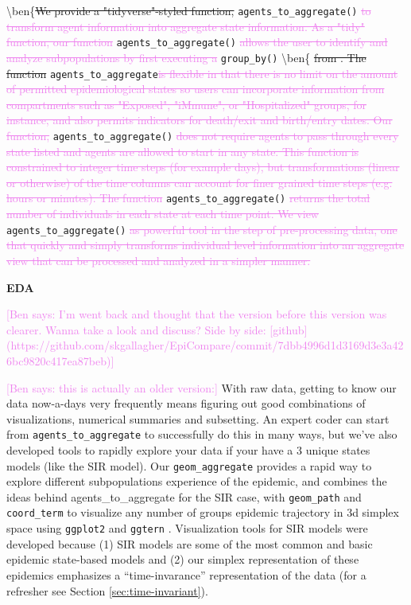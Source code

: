 \documentclass[
  shortnames]{jss}
\begin{document}
\textbackslash ben\{\sout{We provide a "tidyverse"-styled function, }\texttt{agents\_to\_aggregate()}\textcolor{violet}{\sout{ to transform agent information into aggregate state information.  As a "tidy" function, our function }}\texttt{agents\_to\_aggregate()}
\textcolor{violet}{\sout{allows the user to identify and analyze subpopulations by first executing a }}\texttt{group\_by()}
\textbackslash ben\{\sout{{ from . The function }}\texttt{agents\_to\_aggregate}\textcolor{violet}{\sout{is flexible in that there is no limit on the amount of permitted epidemiological states so users can incorporate information from compartments such as "Exposed", "iMmune", or "Hospitalized" groups, for instance, and also permits indicators for death/exit and birth/entry dates. Our function,}}
\texttt{agents\_to\_aggregate()}\textcolor{violet}{\sout{ does not require agents to pass through every state listed and agents are allowed to start in any state. This function is constrained to integer time steps (for example days), but transformations (linear or otherwise) of the time columns can account for finer grained time steps (e.g. hours or minutes). The function }}\texttt{agents\_to\_aggregate()}\textcolor{violet}{\sout{ returns the total number of individuals in each state at each time point.  We view }}\texttt{agents\_to\_aggregate()}\textcolor{violet}{\sout{ as powerful tool in the step of pre-processing data, one that quickly and simply transforms individual level information into an aggregate view that can be processed and analyzed in a simpler manner.}}

\textbf{EDA}

\textcolor{violet}{[Ben says: I'm went back and thought that the version before this version was clearer. Wanna take a look and discuss? Side by side: [github](https://github.com/skgallagher/EpiCompare/commit/7dbb4996d1d3169d3e3a426bc9820c417ea87beb)]}

\textcolor{violet}{[Ben says: this is actually an older version:]} With
raw data, getting to know our data now-a-days very frequently means
figuring out good combinations of visualizations, numerical summaries
and subsetting. An expert coder can start from
\texttt{agents\_to\_aggregate} to successfully do this in many ways, but
we've also developed tools to rapidly explore your data if your have a 3
unique states models (like the SIR model). Our \texttt{geom\_aggregate}
provides a rapid way to explore different subpopulations experience of
the epidemic, and combines the ideas behind agents\_to\_aggregate for
the SIR case, with \texttt{geom\_path} and \texttt{coord\_term} to
visualize any number of groups epidemic trajectory in 3d simplex space
using \texttt{ggplot2} and \texttt{ggtern}
\citep{Wickham2016, Hamilton2018}. Visualization tools for SIR models
were developed because (1) SIR models are some of the most common and
basic epidemic state-based models and (2) our simplex representation of
these epidemics emphasizes a ``time-invarance'' representation of the
data (for a refresher see Section \ref{sec:time-invariant}).
\end{document}
